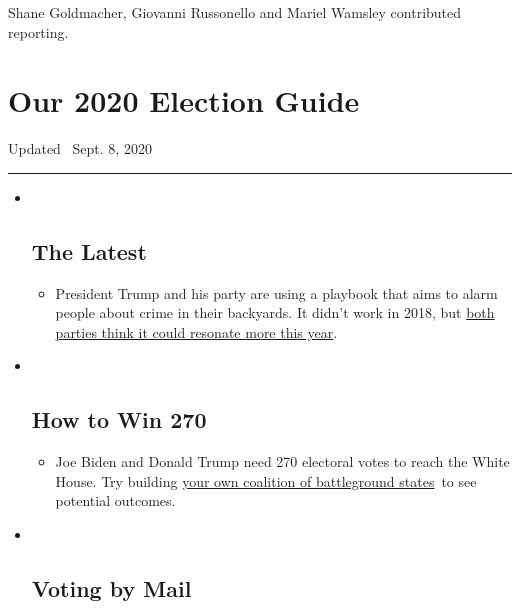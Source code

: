 Shane Goldmacher, Giovanni Russonello and Mariel Wamsley contributed
reporting.

\hypertarget{our-2020-election-guide}{%
\section{Our 2020 Election Guide}\label{our-2020-election-guide}}

Updated ~Sept. 8, 2020

\begin{center}\rule{0.5\linewidth}{\linethickness}\end{center}

\begin{itemize}
\item ~
  \hypertarget{the-latest}{%
  \subsection{The Latest}\label{the-latest}}

  \begin{itemize}
  \item
    President Trump and his party are using a playbook that aims to
    alarm people about crime in their backyards. It didn't work in 2018,
    but
    \href{https://www.nytimes3xbfgragh.onion/2020/09/08/us/politics/trump-republicans-fear-strategy.html?action=click\&pgtype=Article\&state=default\&region=BELOW_MAIN_CONTENT\&context=storylines_guide}{both
    parties think it could resonate more this year}.
  \end{itemize}
\item ~
  \hypertarget{how-to-win-270}{%
  \subsection{How to Win 270}\label{how-to-win-270}}

  \begin{itemize}
  \item
    Joe Biden and Donald Trump need 270 electoral votes to reach the
    White House. Try building
    \href{https://www.nytimes3xbfgragh.onion/interactive/2020/us/elections/election-states-biden-trump.html?action=click\&pgtype=Article\&state=default\&region=BELOW_MAIN_CONTENT\&context=storylines_guide}{your
    own coalition of battleground states}~to see potential outcomes.
  \end{itemize}
\item ~
  \hypertarget{voting-by-mail}{%
  \subsection{Voting by Mail}\label{voting-by-mail}}


\end{itemize}

